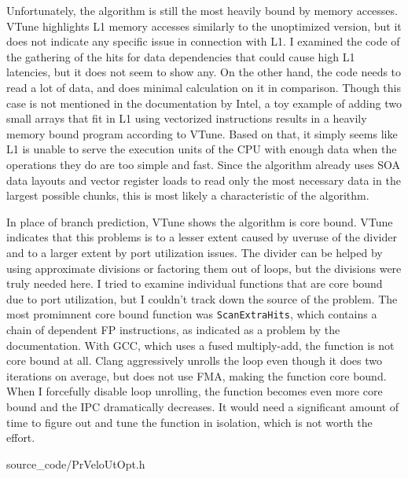 \documentclass[12pt]{article}
\newcommand{\code}[1]{\texttt{#1}}
\begin{document}
\vspace{1pc}

Unfortunately, the algorithm is still the most heavily bound by memory accesses. VTune highlights L1 memory accesses similarly to the unoptimized version, but it does not indicate any specific issue in connection with L1. I examined the code of the gathering of the hits for data dependencies that could cause high L1 latencies, but it does not seem to show any. On the other hand, the code needs to read a lot of data, and does minimal calculation on it in comparison. Though this case is not mentioned in the documentation by Intel, a toy example of adding two small arrays that fit in L1 using vectorized instructions results in a heavily memory bound program according to VTune. Based on that, it simply seems like L1 is unable to serve the execution units of the CPU with enough data when the operations they do are too simple and fast. Since the algorithm already uses SOA data layouts and vector register loads to read only the most necessary data in the largest possible chunks, this is most likely a characteristic of the algorithm.

\vspace{1pc}

In place of branch prediction, VTune shows the algorithm is core bound. VTune indicates that this problems is to a lesser extent caused by uveruse of the divider and to a larger extent by port utilization issues. The divider can be helped by using approximate divisions or factoring them out of loops, but the divisions were truly needed here. I tried to examine individual functions that are core bound due to port utilization, but I couldn't track down the source of the problem. The most promimnent core bound function was \code{ScanExtraHits}, which contains a chain of dependent FP instructions, as indicated as a problem by the documentation\cite{intel_vtune_docs}. With GCC, which uses a fused multiply-add, the function is not core bound at all. Clang aggressively unrolls the loop even though it does two iterations on average, but does not use FMA, making the function core bound. When I forcefully disable loop unrolling, the function becomes even more core bound and the IPC dramatically decreases. It would need a significant amount of time to figure out and tune the function in isolation, which is not worth the effort.


	{source_code/PrVeloUtOpt.h}
\end{document}
